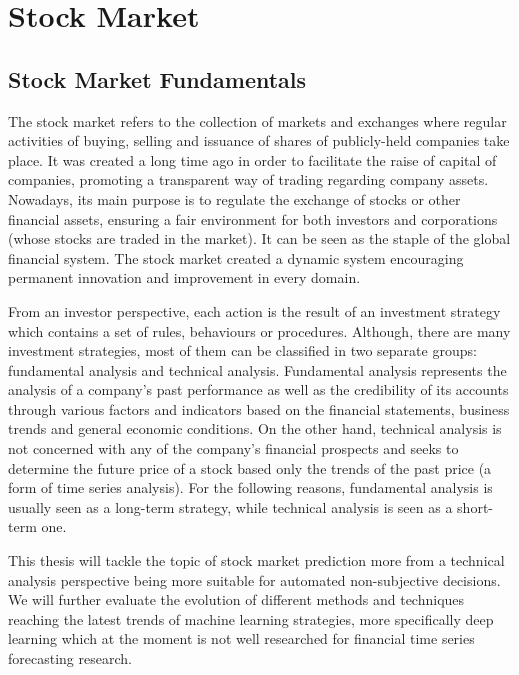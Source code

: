 \section{Stock Market}

\subsection{Stock Market Fundamentals}
The stock market refers to the collection of markets and exchanges where regular activities of buying, selling and issuance of shares of publicly-held companies take place. It was created a long time ago in order to facilitate the raise of capital of companies, promoting a transparent way of trading regarding company assets. Nowadays, its main purpose is to regulate the exchange of stocks or other financial assets, ensuring a fair environment for both investors and corporations (whose stocks are traded in the market). It can be seen as the staple of the global financial system. The stock market created a dynamic system encouraging permanent innovation and improvement in every domain.

From an investor perspective, each action is the result of an investment strategy which contains a set of rules, behaviours or procedures. Although, there are many investment strategies, most of them can be classified in two separate groups: fundamental analysis and technical analysis. Fundamental analysis represents the analysis of a company's past performance as well as the credibility of its accounts through various factors and indicators based on the financial statements, business trends and general economic conditions. On the other hand, technical analysis is not concerned with any of the company's financial prospects and seeks to determine the future price of a stock based only the trends of the past price (a form of time series analysis). For the following reasons, fundamental analysis is usually seen as a long-term strategy, while technical analysis is seen as a  short-term one.

This thesis will tackle the topic of stock market prediction more from a technical analysis perspective being more suitable for automated non-subjective decisions. We will further evaluate the evolution of different methods and techniques reaching the latest trends of machine learning strategies, more specifically deep learning which at the moment is not well researched for financial time series forecasting research. \cite{sezer2020financial}



